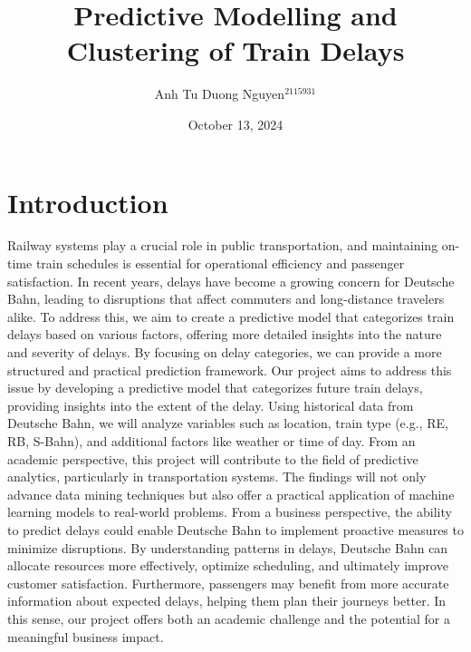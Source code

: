 \documentclass[a4paper,oneside,bibliography=totoc]{scrbook}
\begin{document}
\frontmatter \subject{Data Mining Project Outline HWS24} %
\title{Predictive Modelling and Clustering of Train Delays}
\author{Anh Tu Duong Nguyen$^{2115931}$} \date{October 13, 2024}
\publishers{{\small Submitted to}\\
Data and Web Science Group\\
Prof.\ Dr.\ Hertling\\
University of Mannheim\\}

\maketitle

\mainmatter
\chapter{Introduction}
\label{ch:intro}
Railway systems play a crucial role in public transportation, and maintaining on-time train schedules is essential for operational efficiency and passenger satisfaction. In recent years, delays have become a growing concern for Deutsche Bahn, leading to disruptions that affect commuters and long-distance travelers alike. To address this, we aim to create a predictive model that categorizes train delays based on various factors, offering more detailed insights into the nature and severity of delays. By focusing on delay categories, we can provide a more structured and practical prediction framework.
Our project aims to address this issue by developing a predictive model that categorizes future train delays, providing insights into the extent of the delay. Using historical data from Deutsche Bahn, we will analyze variables such as location, train type (e.g., RE, RB, S-Bahn), and additional factors like weather or time of day. From an academic perspective, this project will contribute to the field of predictive analytics, particularly in transportation systems. The findings will not only advance data mining techniques but also offer a practical application of machine learning models to real-world problems.
From a business perspective, the ability to predict delays could enable Deutsche Bahn to implement proactive measures to minimize disruptions. By understanding patterns in delays, Deutsche Bahn can allocate resources more effectively, optimize scheduling, and ultimately improve customer satisfaction. Furthermore, passengers may benefit from more accurate information about expected delays, helping them plan their journeys better. In this sense, our project offers both an academic challenge and the potential for a meaningful business impact.
\end{document}
